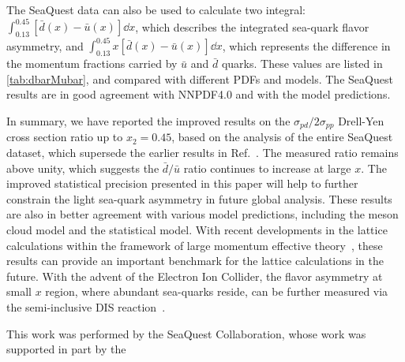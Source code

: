 \documentclass[reprint,aps,unsortedaddress,superscriptaddress,prl,floatfix,showpacs,linenumbers]{revtex4-2}
\begin{document}
The SeaQuest data can also be used to calculate two integral: 
$\int^{0.45}_{0.13} \left[\bar{d}\left(x\right) - \bar{u}\left(x\right) \right]\dd{x}$,
which describes the integrated sea-quark flavor asymmetry, and 
$\int^{0.45}_{0.13} x\left[\bar{d}\left(x\right) - \bar{u}\left(x\right) \right]\dd{x}$,
which represents the difference in the momentum fractions carried 
by $\bar{u}$ and $\bar{d}$ quarks.
These values are listed in \cref{tab:dbarMubar}, and compared with different PDFs and models.
The SeaQuest results are in good agreement with NNPDF4.0 and with the model predictions.

In summary, we have reported the improved results on the 
$\sigma_{pd}/2\sigma_{pp}$ Drell-Yen cross section ratio up to $x_2=0.45$,
based on the analysis of the entire SeaQuest dataset,
which supersede the earlier results in Ref.~\cite{dove2021,dove2023}.
The measured ratio remains above unity, 
which suggests the $\bar{d}/\bar{u}$ ratio continues to increase at large $x$.
The improved statistical precision presented in this paper will help to 
further constrain the light sea-quark asymmetry in future global analysis.
These results are also in better agreement with various model predictions, 
including the meson cloud model and the statistical model.
With recent developments in the lattice calculations within the framework 
of large momentum effective theory~\cite{constantinou2021},
these results can provide an important benchmark for the lattice 
calculations in the future.
With the advent of the Electron Ion Collider, the flavor asymmetry at small $x$ region,
where abundant sea-quarks reside, can be further measured via the semi-inclusive DIS reaction~\cite{ackerstaff1998}.

\begin{acknowledgments}
	This work was performed by the SeaQuest Collaboration, whose work was supported in part by the
\end{acknowledgments}

\end{document}
